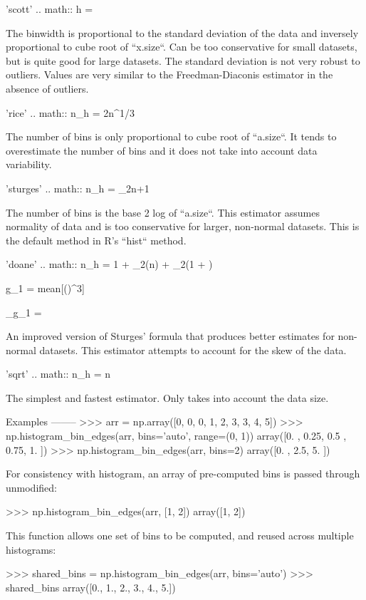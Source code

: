 \begin{DoxyVerb}
'scott'
    .. math:: h = \sigma {}

    The binwidth is proportional to the standard deviation of the
    data and inversely proportional to cube root of ``x.size``. Can
    be too conservative for small datasets, but is quite good for
    large datasets. The standard deviation is not very robust to
    outliers. Values are very similar to the Freedman-Diaconis
    estimator in the absence of outliers.

'rice'
    .. math:: n_h = 2n^{1/3}

    The number of bins is only proportional to cube root of
    ``a.size``. It tends to overestimate the number of bins and it
    does not take into account data variability.

'sturges'
    .. math:: n_h = \log _{2}n+1

    The number of bins is the base 2 log of ``a.size``.  This
    estimator assumes normality of data and is too conservative for
    larger, non-normal datasets. This is the default method in R's
    ``hist`` method.

'doane'
    .. math:: n_h = 1 + \log_{2}(n) +
                    \log_{2}(1 + )

        g_1 = mean[()^3]

        \sigma_{g_1} = 

    An improved version of Sturges' formula that produces better
    estimates for non-normal datasets. This estimator attempts to
    account for the skew of the data.

'sqrt'
    .. math:: n_h = \sqrt n

    The simplest and fastest estimator. Only takes into account the
    data size.

Examples
--------
>>> arr = np.array([0, 0, 0, 1, 2, 3, 3, 4, 5])
>>> np.histogram_bin_edges(arr, bins='auto', range=(0, 1))
array([0.  , 0.25, 0.5 , 0.75, 1.  ])
>>> np.histogram_bin_edges(arr, bins=2)
array([0. , 2.5, 5. ])

For consistency with histogram, an array of pre-computed bins is
passed through unmodified:

>>> np.histogram_bin_edges(arr, [1, 2])
array([1, 2])

This function allows one set of bins to be computed, and reused across
multiple histograms:

>>> shared_bins = np.histogram_bin_edges(arr, bins='auto')
>>> shared_bins
array([0., 1., 2., 3., 4., 5.])


\end{DoxyVerb}
